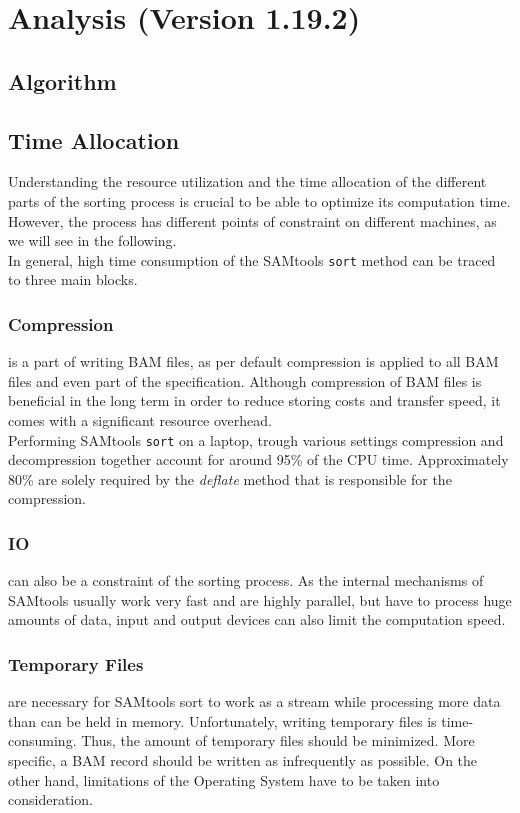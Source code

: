 \section{Analysis (Version 1.19.2)}

\subsection{Algorithm}

\FloatBarrier

\subsection{Time Allocation}
Understanding the resource utilization and the time allocation of the different parts of the sorting process is crucial to be able to optimize its computation time. However, the process has different points of constraint on different machines, as we will see in the following. \\
In general, high time consumption of the SAMtools \texttt{sort} method can be traced to three main blocks.

\subsubsection{Compression} is a part of writing BAM files, as per default compression is applied to all BAM files and even part of the specification. Although compression of BAM files is beneficial in the long term in order to reduce storing costs and transfer speed, it comes with a significant resource overhead. \\
Performing SAMtools \texttt{sort} on a laptop, trough various settings compression and decompression together account for around 95\% of the CPU time. Approximately 80\% are solely required by the \textit{deflate} method that is responsible for the compression.

\subsubsection{IO} can also be a constraint of the sorting process. As the internal mechanisms of SAMtools usually work very fast and are highly parallel, but have to process huge amounts of data, input and output devices can also limit the computation speed.

\subsubsection{Temporary Files} are necessary for SAMtools sort to work as a stream while processing more data than can be held in memory. Unfortunately, writing temporary files is time-consuming. Thus, the amount of temporary files should be minimized. More specific, a BAM record should be written as infrequently as possible. On the other hand, limitations of the Operating System have to be taken into consideration.

